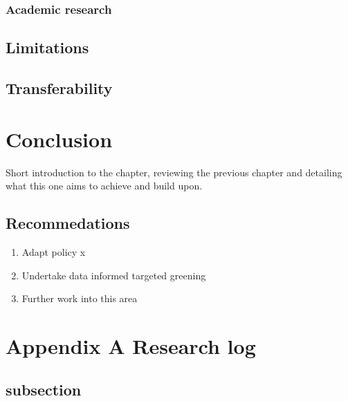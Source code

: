\documentclass[
  12pt,
  oneside]{book}
\providecommand{\tightlist}{%
  \setlength{\itemsep}{0pt}\setlength{\parskip}{0pt}}
\begin{document}
\hypertarget{academic-research}{%
\subsection{Academic research}\label{academic-research}}

\hypertarget{limitations}{%
\section{Limitations}\label{limitations}}

\hypertarget{transferability}{%
\section{Transferability}\label{transferability}}

\hypertarget{conclusion}{%
\chapter{Conclusion}\label{conclusion}}

Short introduction to the chapter, reviewing the previous chapter and detailing what this one aims to achieve and build upon.

\hypertarget{recommedations}{%
\section{Recommedations}\label{recommedations}}

\begin{enumerate}
\def\labelenumi{\arabic{enumi}.}
\tightlist
\item
  Adapt policy x
\item
  Undertake data informed targeted greening
\item
  Further work into this area
\end{enumerate}

\printbibliography

\hypertarget{appendix-a-research-log}{%
\chapter*{Appendix A Research log}\label{appendix-a-research-log}}


\hypertarget{subsection}{%
\section*{subsection}\label{subsection}}
\end{document}
